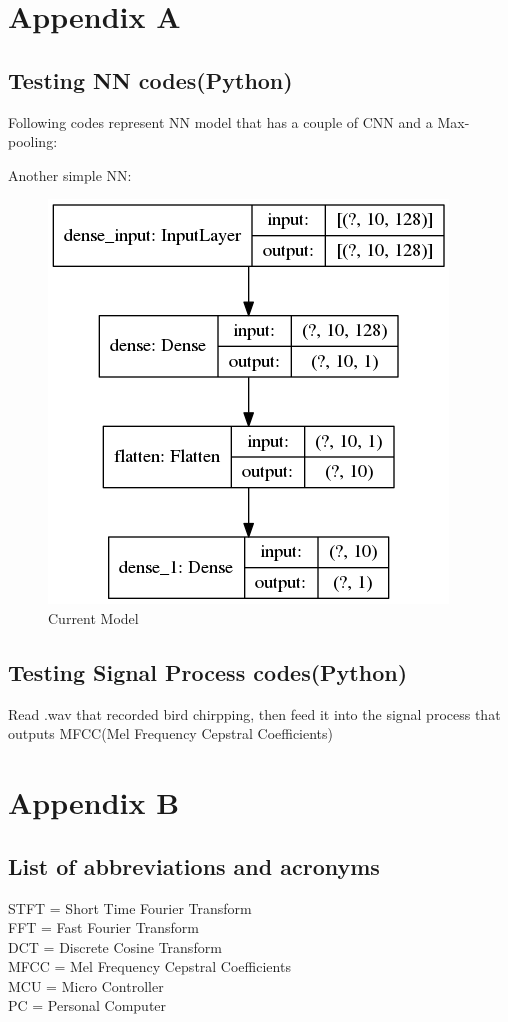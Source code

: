 \documentclass{article}
\begin{document}
\appendix
\section{Appendix A}
\subsection{Testing NN codes(Python)}

Following codes represent NN model that has a couple of CNN and a Max-pooling:

\hfill \break
Another simple NN:


\begin{figure}[H]
\centering
\includegraphics[scale=0.3]{../NN/audio/src/model.png}
\caption{Current Model}
\label{model}
\end{figure}
\newpage
\subsection{Testing Signal Process codes(Python)}
Read .wav that recorded bird chirpping, then feed it into the signal process that outputs MFCC(Mel Frequency Cepstral Coefficients)



\section{Appendix B}
\subsection{List of abbreviations and acronyms}

STFT = Short Time Fourier Transform\\
FFT = Fast Fourier Transform\\
DCT = Discrete Cosine Transform\\
MFCC = Mel Frequency Cepstral Coefficients\\
MCU = Micro Controller\\
PC = Personal Computer\\
\end{document}
